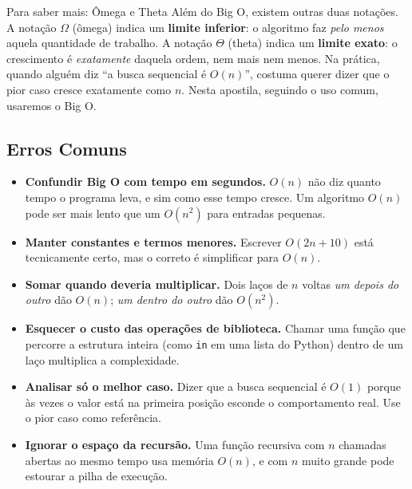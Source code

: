 \begin{destaque}{Para saber mais: Ômega e Theta}
Além do Big O, existem outras duas notações. A notação $\Omega$ (ômega) indica um \textbf{limite inferior}: o algoritmo faz \textit{pelo menos} aquela quantidade de trabalho. A notação $\Theta$ (theta) indica um \textbf{limite exato}: o crescimento é \textit{exatamente} daquela ordem, nem mais nem menos. Na prática, quando alguém diz ``a busca sequencial é $O(n)$'', costuma querer dizer que o pior caso cresce exatamente como $n$. Nesta apostila, seguindo o uso comum, usaremos o Big O.
\end{destaque}

\subsection{Erros Comuns}

\begin{itemize}
  \item \textbf{Confundir Big O com tempo em segundos.} $O(n)$ não diz quanto tempo o programa leva, e sim como esse tempo cresce. Um algoritmo $O(n)$ pode ser mais lento que um $O(n^2)$ para entradas pequenas.
  \item \textbf{Manter constantes e termos menores.} Escrever $O(2n + 10)$ está tecnicamente certo, mas o correto é simplificar para $O(n)$.
  \item \textbf{Somar quando deveria multiplicar.} Dois laços de $n$ voltas \textit{um depois do outro} dão $O(n)$; \textit{um dentro do outro} dão $O(n^2)$.
  \item \textbf{Esquecer o custo das operações de biblioteca.} Chamar uma função que percorre a estrutura inteira (como \texttt{in} em uma lista do Python) dentro de um laço multiplica a complexidade.
  \item \textbf{Analisar só o melhor caso.} Dizer que a busca sequencial é $O(1)$ porque às vezes o valor está na primeira posição esconde o comportamento real. Use o pior caso como referência.
  \item \textbf{Ignorar o espaço da recursão.} Uma função recursiva com $n$ chamadas abertas ao mesmo tempo usa memória $O(n)$, e com $n$ muito grande pode estourar a pilha de execução.
\end{itemize}
